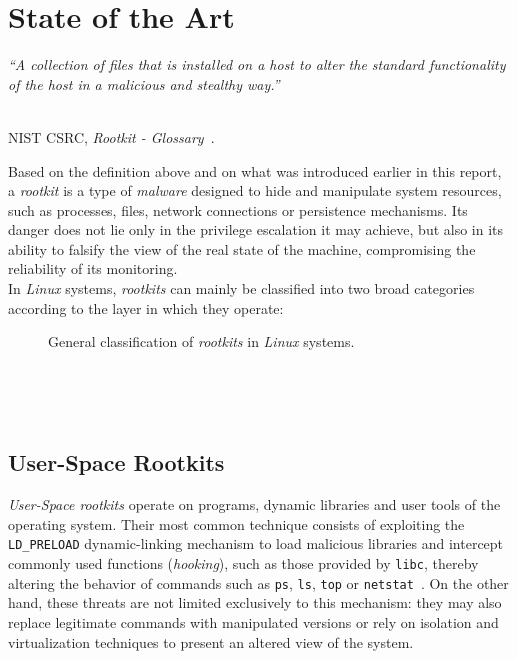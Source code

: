\chapter{State of the Art}
\label{cap:capitulo3}

\begin{flushright}
\begin{minipage}[]{10cm}
\emph{``A collection of files that is installed on a host to alter the standard functionality of the host in a malicious and stealthy way.''}\\
\end{minipage}\\

NIST CSRC, \textit{Rootkit - Glossary}~\cite{nist_rootkit}.\\
\end{flushright}

Based on the definition above and on what was introduced earlier in this report, a \textit{rootkit} is a type of \textit{malware} designed to hide and manipulate system resources, such as processes, files, network connections or persistence mechanisms.
Its danger does not lie only in the privilege escalation it may achieve, but also in its ability to falsify the view of the real state of the machine, compromising the reliability of its monitoring.\\

In \textit{Linux} systems, \textit{rootkits} can mainly be classified into two broad categories according to the layer in which they operate:\\

\begin{figure}[h!]
  \centering
  \scalebox{0.84}{}
  \caption{General classification of \textit{rootkits} in \textit{Linux} systems.}
  \label{fig:rootkits_types}
\end{figure}

\

\

\section{User-Space Rootkits}
\label{sec:user_rootkits}

\textit{User-Space rootkits} operate on programs, dynamic libraries and user tools of the operating system.
Their most common technique consists of exploiting the \texttt{LD\_PRELOAD} dynamic-linking mechanism to load malicious libraries and intercept commonly used functions (\textit{hooking}), such as those provided by \texttt{libc},
thereby altering the behavior of commands such as \texttt{ps}, \texttt{ls}, \texttt{top} or \texttt{netstat}~\cite{rootkits}.
On the other hand, these threats are not limited exclusively to this mechanism: they may also replace legitimate commands with manipulated versions or rely on isolation and virtualization techniques to present an altered view of the system.\\

